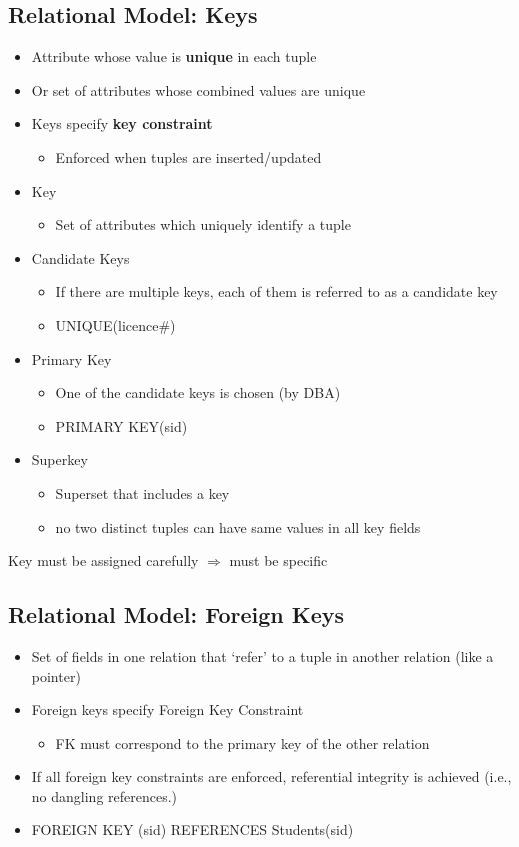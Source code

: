 \documentclass[11pt]{article}
\begin{document}
\subsection{Relational Model: Keys}
\label{sec:org81e435b}
\begin{itemize}
\item Attribute whose value is \textbf{unique} in each tuple
\item Or set of attributes whose combined values are unique
\item Keys specify \textbf{key constraint}
\begin{itemize}
\item Enforced when tuples are inserted/updated
\end{itemize}

\item Key
\begin{itemize}
\item Set of attributes which uniquely identify a tuple
\end{itemize}
\item Candidate Keys
\begin{itemize}
\item If there are multiple keys, each of them is referred to as a candidate key
\item UNIQUE(licence\#)
\end{itemize}
\item Primary Key
\begin{itemize}
\item One of the candidate keys is chosen (by DBA)
\item PRIMARY KEY(sid)
\end{itemize}
\item Superkey
\begin{itemize}
\item Superset that includes a key
\item no two distinct tuples can have same values in all key fields
\end{itemize}
\end{itemize}

Key must be assigned carefully \(\Rightarrow\) must be specific
\subsection{Relational Model: Foreign Keys}
\label{sec:org5d7ee7c}
\begin{itemize}
\item Set of fields in one relation that `refer’ to a tuple in another relation
(like a pointer)
\item Foreign keys specify Foreign Key Constraint
\begin{itemize}
\item FK must correspond to the primary key of the other relation
\end{itemize}
\item If all foreign key constraints are enforced, referential integrity is achieved
(i.e., no dangling references.)
\item FOREIGN KEY (sid) REFERENCES Students(sid)
\end{itemize}
\end{document}
